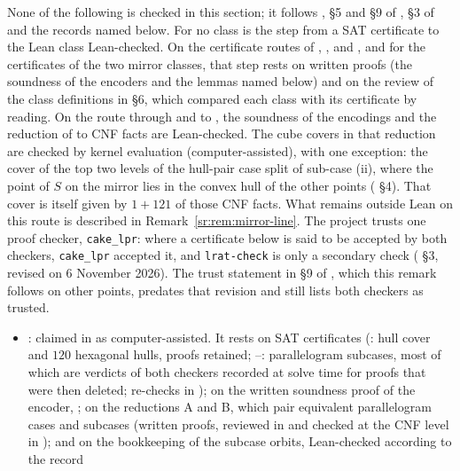 \begin{remark}\label{sr:rem:records}
None of the following is checked in this section; it follows , \S5 and \S9 of
, \S3 of  and the records named below. For no class is the step from
a SAT certificate to the Lean class Lean-checked. On the certificate routes of , ,
 and , and for the  certificates of the two mirror classes, that step rests
on written proofs (the soundness of the encoders and the lemmas named below) and on the review of the class
definitions in  \S6, which compared each class with its certificate by reading. On the route
through  and  to , the soundness of the encodings and the reduction of
 to CNF facts are Lean-checked. The cube covers in that reduction are checked by kernel
evaluation (computer-assisted), with one exception: the cover of the top two levels of the hull-pair case split of
sub-case (ii), where the point of $S$ on the mirror lies in the convex hull of the other points
( \S4). That cover is itself given by $1+121$ of those CNF facts. What remains outside Lean on
this route is described in Remark~\ref{sr:rem:mirror-line}. The
project trusts one proof checker, \texttt{cake\_lpr}: where a certificate below is said to be accepted by both
checkers, \texttt{cake\_lpr} accepted it, and \texttt{lrat-check} is only a secondary check (
\S3, revised on 6 November 2026). The trust statement in \S9 of , which this remark follows on
other points, predates that revision and still lists both checkers as trusted.
\begin{itemize}
\item {}: claimed in  as computer-assisted. It rests on SAT certificates (:
  hull cover and $120$ hexagonal hulls, proofs retained; --: parallelogram subcases, most of which
  are verdicts of both checkers recorded at solve time for proofs that were then deleted; re-checks in
  ); on the written soundness proof of the encoder, ; on the reductions A and B,
  which pair equivalent parallelogram cases and subcases (written proofs, reviewed in  and checked at
  the CNF level in ); and on the bookkeeping of the subcase orbits, Lean-checked according to the record

\end{itemize}
\end{remark}
